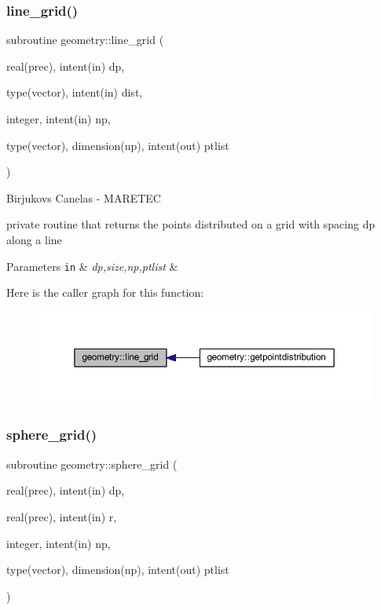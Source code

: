 \subsubsection{\texorpdfstring{line\+\_\+grid()}{line\_grid()}}
{\footnotesize\ttfamily subroutine geometry\+::line\+\_\+grid (\begin{DoxyParamCaption}\item[{real(prec), intent(in)}]{dp,  }\item[{type(vector), intent(in)}]{dist,  }\item[{integer, intent(in)}]{np,  }\item[{type(vector), dimension(np), intent(out)}]{ptlist }\end{DoxyParamCaption})\hspace{0.3cm}{\ttfamily [private]}}



Birjukovs Canelas -\/ M\+A\+R\+E\+T\+EC 

private routine that returns the points distributed on a grid with spacing dp along a line 
\begin{DoxyParams}[1]{Parameters}
\mbox{\tt in}  & {\em dp,size,np,ptlist} & \\
\hline
\end{DoxyParams}
Here is the caller graph for this function\+:\nopagebreak
\begin{figure}[H]
\begin{center}
\leavevmode
\includegraphics[width=350pt]{namespacegeometry_a7d580229bc67448e6389d0beef0c04cb_icgraph}
\end{center}
\end{figure}
\mbox{\label{namespacegeometry_a9629040285de7053d42f434333528702}} 
\subsubsection{\texorpdfstring{sphere\+\_\+grid()}{sphere\_grid()}}
{\footnotesize\ttfamily subroutine geometry\+::sphere\+\_\+grid (\begin{DoxyParamCaption}\item[{real(prec), intent(in)}]{dp,  }\item[{real(prec), intent(in)}]{r,  }\item[{integer, intent(in)}]{np,  }\item[{type(vector), dimension(np), intent(out)}]{ptlist }\end{DoxyParamCaption})\hspace{0.3cm}{\ttfamily [private]}}



